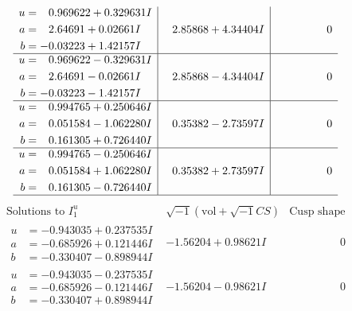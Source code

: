 \documentclass[1p]{elsarticle_modified}
\theoremstyle{definition}
\newcommand{\I}{\sqrt{-1}}
\begin{document}
$$\begin{array}{c|c|c}
\begin{aligned}
u &= \phantom{-}0.969622 + 0.329631 I \\
a &= \phantom{-}2.64691 + 0.02661 I \\
b &= -0.03223 + 1.42157 I\end{aligned}
 & \phantom{-}2.85868 + 4.34404 I & \phantom{-0.000000 } 0 \\ \hline\begin{aligned}
u &= \phantom{-}0.969622 - 0.329631 I \\
a &= \phantom{-}2.64691 - 0.02661 I \\
b &= -0.03223 - 1.42157 I\end{aligned}
 & \phantom{-}2.85868 - 4.34404 I & \phantom{-0.000000 } 0 \\ \hline\begin{aligned}
u &= \phantom{-}0.994765 + 0.250646 I \\
a &= \phantom{-}0.051584 - 1.062280 I \\
b &= \phantom{-}0.161305 + 0.726440 I\end{aligned}
 & \phantom{-}0.35382 - 2.73597 I & \phantom{-0.000000 } 0 \\ \hline\begin{aligned}
u &= \phantom{-}0.994765 - 0.250646 I \\
a &= \phantom{-}0.051584 + 1.062280 I \\
b &= \phantom{-}0.161305 - 0.726440 I\end{aligned}
 & \phantom{-}0.35382 + 2.73597 I & \phantom{-0.000000 } 0\\
 \hline 
 \end{array}$$\newpage$$\begin{array}{c|c|c}  
\text{Solutions to }I^u_{1}& \I (\text{vol} + \sqrt{-1}CS) & \text{Cusp shape}\\
 \hline 
\begin{aligned}
u &= -0.943035 + 0.237535 I \\
a &= -0.685926 + 0.121446 I \\
b &= -0.330407 - 0.898944 I\end{aligned}
 & -1.56204 + 0.98621 I & \phantom{-0.000000 } 0 \\ \hline\begin{aligned}
u &= -0.943035 - 0.237535 I \\
a &= -0.685926 - 0.121446 I \\
b &= -0.330407 + 0.898944 I\end{aligned}
 & -1.56204 - 0.98621 I & \phantom{-0.000000 } 0 \\ \hline\begin{aligned}

\end{aligned}
\end{array}$$
\end{document}
